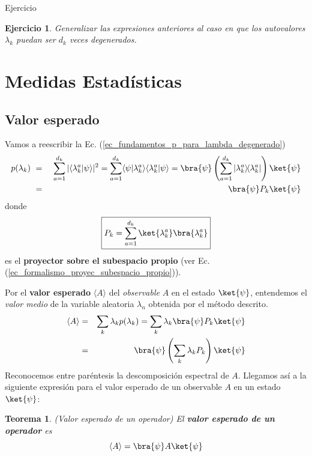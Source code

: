 \documentclass[a4paper,11pt]{book} %
\newtheorem{teorema_contador}{Teorema}
\newcommand{\Teorema}[1]{
		\begin{mybox_gray2}{}
			\begin{teorema_contador}
				 #1 
			\end{teorema_contador} 
		\end{mybox_gray2}
	}
\newtheorem{ejercicio_contador}{Ejercicio}
\newcommand{\Ejercicio}[1]{
		\begin{mybox_gray}{Ejercicio} 
			\begin{ejercicio_contador}
				 #1 
			\end{ejercicio_contador} 
		\end{mybox_gray}
	}
\numberwithin{equation}{chapter}
\newcommand{\braket}[2]{\langle #1|#2\rangle}
\newcommand{\ketbra}[2]{| #1\rangle \! \langle #2|}
\begin{document}
	
	\Ejercicio{
	Generalizar las expresiones anteriores al caso en que los autovalores $\lambda_k$ puedan ser $d_k$ veces degenerados.
	}

	\section{Medidas Estadísticas}
	
		\subsection{Valor esperado}

Vamos a reescribir la Ec. (\ref{ec_fundamentos_p_para_lambda_degenerado})
\begin{eqnarray} \label{ec_fundamentos_p_para_lambda_degenerado_proyector}
p(\lambda_k)~ 
&=& ~ \sum_{a=1}^{d_k}|\braket{\lambda^a_k}{\psi}|^2 
 = \sum_{a=1}^{d_k} \braket{\psi}{\lambda^a_k}\braket{\lambda^a_k}{\psi}  
 =\bra{\psi}\left(\sum_{a=1}^{d_k}\ketbra{\lambda^a_k}{\lambda^a_k}\right) \ket{\psi}\nonumber\\
&=&  \bra{\psi}P_k\ket{\psi} 
\end{eqnarray}    
donde 
	\begin{equation}
	\boxed{P_k = \sum_{a=1}^{d_k} \ket{\lambda^a_k}\bra{\lambda^a_k}}
	\end{equation}
es el \textbf{proyector sobre el subespacio propio} (ver Ec. (\ref{ec_formalismo_proyec_subespacio_propio})).

Por el \textbf{valor esperado} $\langle A\rangle$ del \textit{observable} $A$ en el estado $\ket{\psi}$, entendemos el \textit{valor medio} de la variable aleatoria $\lambda_n$ obtenida por el método descrito. 
\begin{eqnarray}
\langle A\rangle 
	&= &  \sum_k \lambda_k p(\lambda_k)
     =  \sum_k \lambda_k \bra{\psi}P_k\ket{\psi}  \nonumber \\
	&=& \bra{\psi}\left(\sum_k \lambda_k P_k  \right) \ket{\psi} 
\end{eqnarray}
Reconocemos entre paréntesis la descomposición espectral de $A$. Llegamos así a la siguiente expresión para el valor esperado de un observable $A$ en un estado $\ket{\psi}$:
	
	\Teorema{\textit{(Valor esperado de un operador)}
	El \textbf{valor esperado de un operador} es
		\begin{equation}
		\langle A \rangle=\bra{\psi}A \ket{\psi}
		\end{equation}
	}
\end{document}
